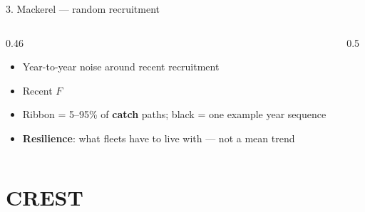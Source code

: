 \documentclass[12pt,aspectratio=169]{beamer}
\begin{document}
\begin{frame}{3. Mackerel --- random recruitment}
  \begin{columns}[T]
    \begin{column}{0.46\textwidth}
      \begin{itemize}
        \item Year-to-year noise around recent recruitment
        \item Recent $F$
        \item Ribbon = 5--95\% of \textbf{catch} paths; black = one example year sequence
        \item \textbf{Resilience}: what fleets have to live with --- not a mean trend
      \end{itemize}
    \end{column}
    \begin{column}{0.5\textwidth}
      \centering
      \\
    \end{column}
  \end{columns}
\end{frame}

\section{CREST}
\end{document}
